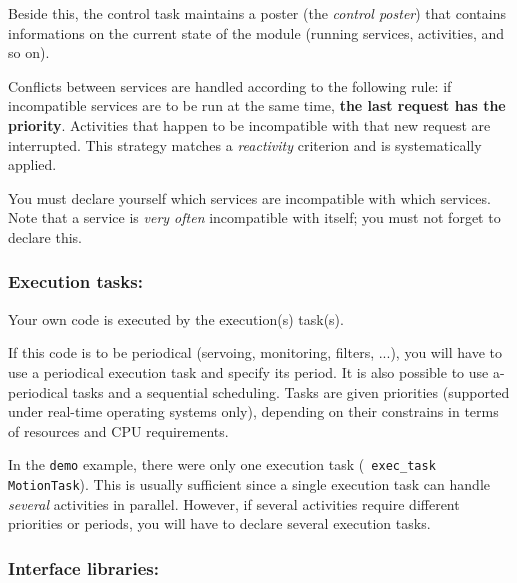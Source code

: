 Beside    this, the control task  maintains   a poster  (the {\em control
poster}) that contains informations on   the current state of the  module
(running services, activities, and so on).

Conflicts between services are   handled  according to the following  rule:  if
incompatible  services are to  be run  at the  same  time, {\bf  the last
request   has  the  priority}. Activities    that  happen to  be
incompatible  with that new request are  interrupted. This strategy matches a
{\em reactivity} criterion and is systematically applied.

You must  declare  yourself which  services  are incompatible with  which
services. Note that   a service is  {\em  very often}  incompatible  with
itself; you must not forget to declare this.


\subsubsection{Execution tasks:}

Your own code is executed by the execution(s) task(s).

If  this code is to  be periodical (servoing,  monitoring, filters, ...),
you will have to use a periodical  execution task and specify its period.
It   is  also  possible   to use   a-periodical  tasks  and  a  sequential
scheduling. Tasks are  given priorities (supported under real-time
operating systems only),
depending on their constrains in terms of resources and CPU requirements.

In the  {\tt  demo} example,  there were  only one  execution  task ({\tt
exec\_task MotionTask}). This   is  usually  sufficient since  a   single
execution task can handle {\em several}  activities in parallel. However,
if several  activities require different  priorities or periods, you will
have to declare several execution tasks.


\subsubsection{Interface libraries:}

